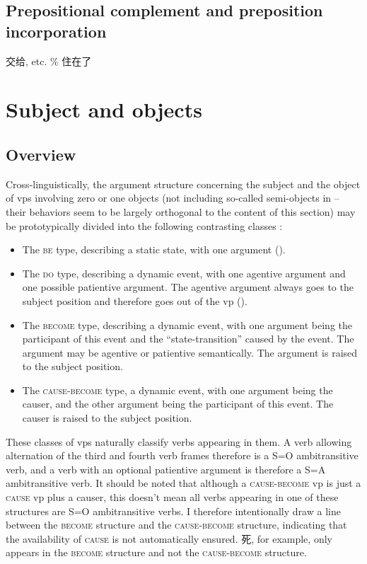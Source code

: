 \documentclass[UTF8, a4paper, oneside, scheme=plain]{ctexrep}
\newcommand*{\citechap}[1]{chap.~{#1}}
\newcommand*{\category}[1]{\textsc{#1}}
\begin{document}
\subsection{Prepositional complement and preposition incorporation}\label{sec:verb-phrase.internal.preposition}

交给, etc. \% 住在了

\section{Subject and objects}

\subsection{Overview}

Cross-linguistically, 
the argument structure concerning the subject and the object of \acs{vp}s 
involving zero or one objects 
(not including so-called semi-objects in 
-- their behaviors seem to be largely orthogonal to the content of this section)
may be prototypically divided into the following contrasting classes 
\citep[\citechap{6}]{deng2010formal}:
\begin{itemize}
    \item The \category{be} type, describing a static state, with one argument
    ().
    \item The \category{do} type, describing a dynamic event, with one agentive argument 
        and one possible patientive argument.
        The agentive argument always goes to the subject position 
        and therefore goes out of the \acs{vp}
        ().
    \item The \category{become} type, describing a dynamic event, 
        with one argument being the participant of this event 
        and the ``state-transition'' caused by the event. 
        The argument may be agentive or patientive semantically.
        The argument is raised to the subject position.
    \item The \category{cause-become} type, a dynamic event, 
        with one argument being the causer, 
        and the other argument being the participant of this event.
        The causer is raised to the subject position.
\end{itemize}

These classes of \acs{vp}s naturally classify verbs appearing in them.
A verb allowing alternation of the third and fourth verb frames therefore 
is a S=O ambitransitive verb,
and a verb with an optional patientive argument 
is therefore a S=A ambitransitive verb.
It should be noted that although a \category{cause-become} \acs{vp}
is just a \category{cause} \acs{vp} plus a causer, 
this doesn't mean all verbs appearing in one of these structures 
are S=O ambitransitive verbs.
I therefore intentionally draw a line 
between the \category{become} structure 
and the \category{cause}-\category{become} structure, 
indicating that the availability of \category{cause} is not automatically ensured. 
死, for example, only appears in the \category{become} structure 
and not the \category{cause}-\category{become} structure.
\end{document}
